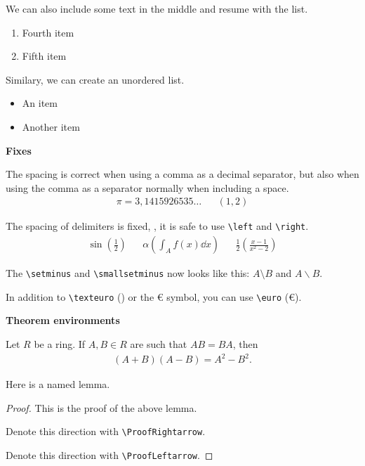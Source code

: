 \documentclass{myassignment}
\begin{document}
We can also include some text in the middle and resume with the list.

\begin{enumerate}[resume*]
    \item Fourth item
    \item Fifth item
\end{enumerate}

Similary, we can create an unordered list.

\begin{itemize}
    \item An item
    \item Another item
\end{itemize}

\textbf{Fixes}

The spacing is correct when using a comma as a decimal separator, but also when using the comma as a separator normally when including a space.
\begin{align*}
    \pi = 3,1415926535\dots && (1, 2)
\end{align*}

The spacing of delimiters is fixed, \ie, it is safe to use \verb|\left| and \verb|\right|.
\begin{align*}
    \sin \left(\frac{1}{2}\right) && \alpha \left( \int_A f(x) \dd x \right) && \frac{1}{2} \left( \frac{x - 1}{x^2 - 2} \right)
\end{align*}

The \verb|\setminus| and \verb|\smallsetminus| now looks like this: $A \setminus B$ and $A \smallsetminus B$.

In addition to \verb|\texteuro| (\texteuro) or the € symbol, you can use \verb|\euro| (\euro).

\textbf{Theorem environments}

\begin{theorem}\label{thm:first}
Let $R$ be a ring. If $A, B \in R$ are such that $AB = BA$, then
\begin{align*}
    (A + B)(A - B) = A^2 - B^2.
\end{align*}
\end{theorem}

\begin{lemma}\label{lem:second}
Here is a named lemma.
\end{lemma}

\begin{proof}
This is the proof of the above lemma.

\ProofRightarrow Denote this direction with \verb|\ProofRightarrow|.

\ProofLeftarrow Denote this direction with \verb|\ProofLeftarrow|.
\end{proof}
\end{document}
